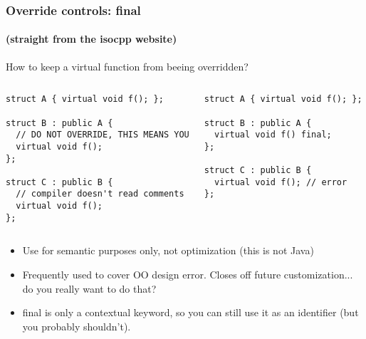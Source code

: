 \begin{frame}[fragile]
\frametitle{Override controls: final}
\framesubtitle{(straight from the isocpp website)}
How to keep a virtual function from beeing overridden?
\begin{columns}[t]
{\scriptsize
\begin{verbatim}
struct A { virtual void f(); };

struct B : public A {
  // DO NOT OVERRIDE, THIS MEANS YOU
  virtual void f(); 
};

struct C : public B {
  // compiler doesn't read comments
  virtual void f(); 
};
\end{verbatim}
}
\pause{}
{\scriptsize
\begin{verbatim}
struct A { virtual void f(); };

struct B : public A {
  virtual void f() final; 
};

struct C : public B {
  virtual void f(); // error
};
\end{verbatim}
}
\end{columns}
\pause{}
\begin{itemize}
\item Use for semantic purposes only, not optimization (this is not Java)
\item Frequently used to cover OO design error.  Closes off future
  customization... do you really want to do that?
\item final is only a contextual keyword, so you can still use it as
  an identifier (but you probably shouldn't).
\end{itemize}
\end{frame}




